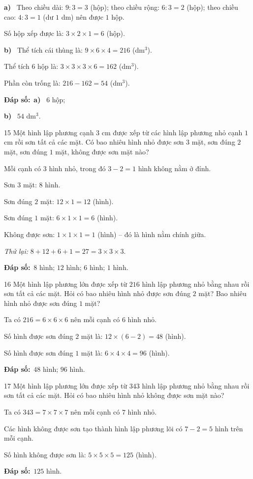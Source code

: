 \documentclass[11pt]{article}
\newif\ifsol \solfalse
\providecommand{\AnsWord}{Đáp số}
\newcommand{\dapso}[1]{\par\textbf{\AnsWord:}\ #1}
\newcommand{\probsol}[1]{%
  \begin{lrbox}{\solmeasure}\begin{minipage}{\dimexpr\linewidth-24pt\relax}#1\end{minipage}\end{lrbox}%
  \ifsol
    \begin{solbox}#1\end{solbox}%
  \else
    \setlength{\solht}{\dimexpr\ht\solmeasure+\dp\solmeasure+0.85cm\relax}%
    \ifdim\solht<1.35cm\setlength{\solht}{1.35cm}\fi
    \begin{tcolorbox}[colback=white,colframe=Line,boxrule=0.8pt,arc=5pt,
      left=8pt,right=8pt,top=4pt,bottom=4pt,height=\solht]{\footnotesize\color{Slate}\itshape\WorkWord}\end{tcolorbox}%
  \fi}
\newcommand{\pa}[1]{\textbf{#1)}\ }
\newcommand{\gap}{\vspace{0.3cm}}
\def\WorkWord{Bài làm:}
\def\AnsWord{Đáp số}
\begin{document}
\probsol{
\pa{a} Theo chiều dài: $9:3=3$ (hộp); theo chiều rộng: $6:3=2$ (hộp); theo chiều cao: $4:3=1$ (dư $1$ dm) nên được $1$ hộp.\par
Số hộp xếp được là: $3\times2\times1=6$ (hộp).\par
\pa{b} Thể tích cái thùng là: $9\times6\times4=216$ (dm$^3$).\par
Thể tích $6$ hộp là: $3\times3\times3\times6=162$ (dm$^3$).\par
Phần còn trống là: $216-162=54$ (dm$^3$).
\dapso{\pa{a} $6$ hộp;\par \pa{b} $54$ dm$^3$.}}
\gap
\begin{probbox}{15}{\relax}
Một hình lập phương cạnh $3$ cm được xếp từ các hình lập phương nhỏ cạnh $1$ cm rồi sơn tất cả các mặt. Có bao nhiêu hình nhỏ được sơn $3$ mặt, sơn đúng $2$ mặt, sơn đúng $1$ mặt, không được sơn mặt nào?
\end{probbox}
\probsol{
Mỗi cạnh có $3$ hình nhỏ, trong đó $3-2=1$ hình không nằm ở đỉnh.\par
Sơn $3$ mặt: $8$ hình.\par
Sơn đúng $2$ mặt: $12\times1=12$ (hình).\par
Sơn đúng $1$ mặt: $6\times1\times1=6$ (hình).\par
Không được sơn: $1\times1\times1=1$ (hình) -- đó là hình nằm chính giữa.\par
\emph{Thử lại:} $8+12+6+1=27=3\times3\times3$.
\dapso{$8$ hình; $12$ hình; $6$ hình; $1$ hình.}}
\gap
\begin{probbox}{16}{\relax}
Một hình lập phương lớn được xếp từ $216$ hình lập phương nhỏ bằng nhau rồi sơn tất cả các mặt. Hỏi có bao nhiêu hình nhỏ được sơn đúng $2$ mặt? Bao nhiêu hình nhỏ được sơn đúng $1$ mặt?
\end{probbox}
\probsol{
Ta có $216=6\times6\times6$ nên mỗi cạnh có $6$ hình nhỏ.\par
Số hình được sơn đúng $2$ mặt là: $12\times(6-2)=48$ (hình).\par
Số hình được sơn đúng $1$ mặt là: $6\times4\times4=96$ (hình).
\dapso{$48$ hình; $96$ hình.}}
\gap
\begin{probbox}{17}{\relax}
Một hình lập phương lớn được xếp từ $343$ hình lập phương nhỏ bằng nhau rồi sơn tất cả các mặt. Hỏi có bao nhiêu hình nhỏ không được sơn mặt nào?
\end{probbox}
\probsol{
Ta có $343=7\times7\times7$ nên mỗi cạnh có $7$ hình nhỏ.\par
Các hình không được sơn tạo thành hình lập phương lõi có $7-2=5$ hình trên mỗi cạnh.\par
Số hình không được sơn là: $5\times5\times5=125$ (hình).
\dapso{$125$ hình.}}
\end{document}
